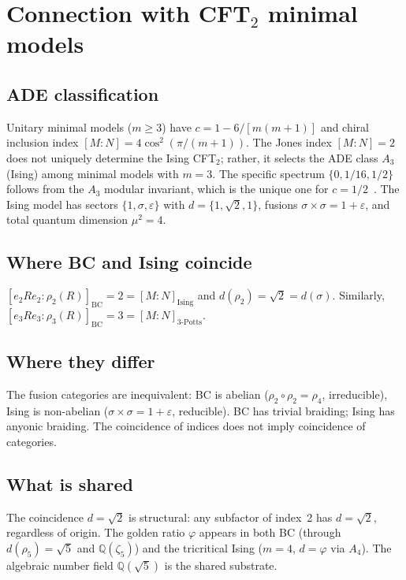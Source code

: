 \documentclass[aps,prl,twocolumn,superscriptaddress,showpacs]{revtex4-2}
\begin{document}
\section{Connection with CFT$_2$ minimal models}
\label{sec:cft}

\subsection{ADE classification}

Unitary minimal models ($m \geq 3$) have $c = 1 - 6/[m(m{+}1)]$ and chiral inclusion index $[M{:}N] = 4\cos^2(\pi/(m{+}1))$. The Jones index $[M{:}N]=2$ does not uniquely determine the Ising CFT$_2$; rather, it selects the ADE class $A_3$ (Ising) among minimal models with $m=3$. The specific spectrum $\{0, 1/16, 1/2\}$ follows from the $A_3$ modular invariant, which is the unique one for $c=1/2$~\cite{CappelliItzyksonZuber1987}. The Ising model has sectors $\{1,\sigma,\varepsilon\}$ with $d = \{1,\sqrt{2},1\}$, fusions $\sigma \times \sigma = 1 + \varepsilon$, and total quantum dimension $\mu^2 = 4$.

\subsection{Where BC and Ising coincide}

$[e_2 R e_2 : \rho_2(R)]_{\mathrm{BC}} = 2 = [M{:}N]_{\mathrm{Ising}}$ and $d(\rho_2) = \sqrt{2} = d(\sigma)$. Similarly, $[e_3 R e_3 : \rho_3(R)]_{\mathrm{BC}} = 3 = [M{:}N]_{\mathrm{3\text{-}Potts}}$.

\subsection{Where they differ}

The fusion categories are inequivalent: BC is abelian ($\rho_2 \circ \rho_2 = \rho_4$, irreducible), Ising is non-abelian ($\sigma \times \sigma = 1 + \varepsilon$, reducible). BC has trivial braiding; Ising has anyonic braiding. The coincidence of indices does not imply coincidence of categories.

\subsection{What is shared}

The coincidence $d = \sqrt{2}$ is structural: any subfactor of index~2 has $d = \sqrt{2}$, regardless of origin. The golden ratio $\varphi$ appears in both BC (through $d(\rho_5) = \sqrt{5}$ and $\mathbb{Q}(\zeta_5)$) and the tricritical Ising ($m=4$, $d=\varphi$ via $A_4$). The algebraic number field $\mathbb{Q}(\sqrt{5})$ is the shared substrate.
\end{document}
